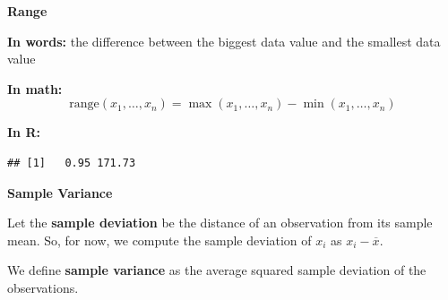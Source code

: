\documentclass[ignorenonframetext,]{beamer}
\newenvironment{Shaded}{\begin{snugshade}}{\end{snugshade}}
\newcommand{\KeywordTok}[1]{\textcolor[rgb]{0.13,0.29,0.53}{\textbf{#1}}}
\newcommand{\NormalTok}[1]{#1}
\newcommand{\OperatorTok}[1]{\textcolor[rgb]{0.81,0.36,0.00}{\textbf{#1}}}
\begin{document}
\begin{frame}[fragile]{}
\protect\hypertarget{section-44}{}

\textbf{\large Range}

\vspace{2ex}

\textbf{In words:} the difference between the biggest data value and the
smallest data value

\vspace{2ex}

\textbf{In math:}
\[\textrm{range}(x_1,\ldots, x_n)=\max(x_1,\ldots, x_n) - \min(x_1,\ldots, x_n)\]

\vspace{2ex}

\textbf{In R:}

\vspace{1ex}\scriptsize

\begin{Shaded}
\end{Shaded}

\begin{verbatim}
## [1]   0.95 171.73
\end{verbatim}

\end{frame}

\begin{frame}{}
\protect\hypertarget{section-45}{}

\textbf{\large Sample Variance}

\vspace{2ex}

Let the \textbf{sample deviation} be the distance of an observation from
its sample mean. So, for now, we compute the sample deviation of \(x_i\)
as \(x_i-\overline{x}\).

\vspace{2ex}

We define \textbf{sample variance} as the average squared sample
deviation of the observations.

\end{frame}
\end{document}
